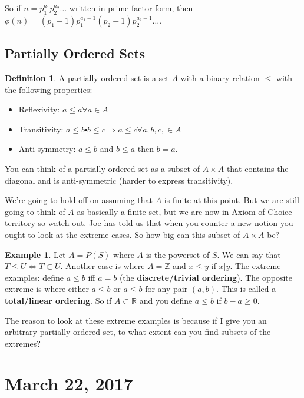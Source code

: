 \documentclass[12pt]{article}
\theoremstyle{definition}
\newtheorem{defn}{Definition}
\newtheorem{exmp}{Example}[section]
\begin{document}
So if $n = p_1^{a_1}p_2^{a_2}\ldots$ written in prime factor form, then
$\phi(n) = (p_1 - 1)p_1^{a_1 - 1}(p_2 - 1)p_2^{a_2 - 1} \ldots$. 

\subsection{Partially Ordered Sets}

\begin{defn}
    A partially ordered set is a set $A$ with a binary relation $\le$ with the following properties:
    \begin{itemize}
        \item Reflexivity: $a \le a \forall a \in A$
        \item
            Transitivity: $a \le b \centerdot b \le c \Rightarrow a \le c
            \forall a, b, c, \in A$
        \item Anti-symmetry: $a \le b$ and $b \le a$ then $b = a$.
    \end{itemize}
    You can think of a partially ordered set as a subset of $A \times A$ that
    contains the diagonal and is anti-symmetric (harder to express transitivity). 
\end{defn}

We're going to hold off on assuming that $A$ is finite at this point. But we
are still going to think of $A$ as basically a finite set, but we are now in
Axiom of Choice territory so watch out. Joe has told us that when you counter a
new notion you ought to look at the extreme cases. So how big can this subset
of $A \times A$ be? 

\begin{exmp}
    Let $A = P(S)$ where $A$ is the powerset of $S$. We can say that $T \le U
    \Leftrightarrow T \subset U$. Another case is where $A = \mathbb{Z}$ and $x
    \le y$ if $x | y$. The extreme examples: define $a \le b$ iff $a = b$ (the
    \textbf{discrete/trivial ordering}). The opposite extreme is where either
    $a \le b$ or $a \le b$ for any pair $(a, b)$. This is called a
    \textbf{total/linear ordering}.  So if $A \subset \mathbb{R}$ and you
    define $a \le b$ if $b - a \ge 0$.
\end{exmp}

The reason to look at these extreme examples is because if I give you an
arbitrary partially ordered set, to what extent can you find subsets of the
extremes?

\section{March 22, 2017}
\end{document}
